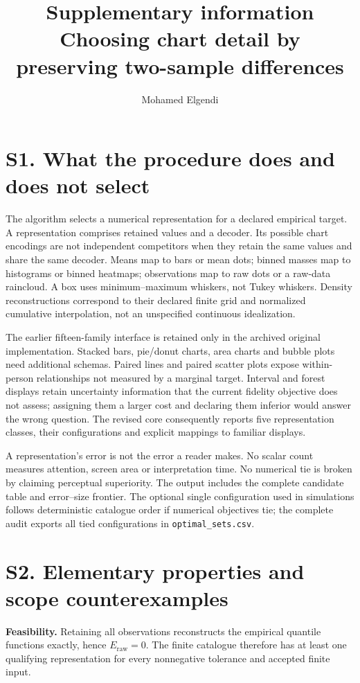 \documentclass[10pt]{article}
\title{Supplementary information\\Choosing chart detail by preserving two-sample differences}
\author{Mohamed Elgendi}\date{}
\begin{document}
\maketitle
\section*{S1. What the procedure does and does not select}
The algorithm selects a numerical representation for a declared empirical target. A representation comprises retained values and a decoder. Its possible chart encodings are not independent competitors when they retain the same values and share the same decoder. Means map to bars or mean dots; binned masses map to histograms or binned heatmaps; observations map to raw dots or a raw-data raincloud. A box uses minimum--maximum whiskers, not Tukey whiskers. Density reconstructions correspond to their declared finite grid and normalized cumulative interpolation, not an unspecified continuous idealization.

The earlier fifteen-family interface is retained only in the archived original implementation. Stacked bars, pie/donut charts, area charts and bubble plots need additional schemas. Paired lines and paired scatter plots expose within-person relationships not measured by a marginal target. Interval and forest displays retain uncertainty information that the current fidelity objective does not assess; assigning them a larger cost and declaring them inferior would answer the wrong question. The revised core consequently reports five representation classes, their configurations and explicit mappings to familiar displays.

A representation's error is not the error a reader makes. No scalar count measures attention, screen area or interpretation time. No numerical tie is broken by claiming perceptual superiority. The output includes the complete candidate table and error--size frontier. The optional single configuration used in simulations follows deterministic catalogue order if numerical objectives tie; the complete audit exports all tied configurations in \nolinkurl{optimal_sets.csv}.

\section*{S2. Elementary properties and scope counterexamples}
\textbf{Feasibility.} Retaining all observations reconstructs the empirical quantile functions exactly, hence $E_{\mathrm{raw}}=0$. The finite catalogue therefore has at least one qualifying representation for every nonnegative tolerance and accepted finite input.
\end{document}
